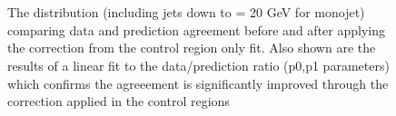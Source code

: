 \begin{figure}[tbhp]
\begin{center}
        \\
         ~~
        \\
        \caption{The \bdphi distribution (including jets down to \pt = 20 GeV for monojet) comparing data and prediction agreement before and after applying the correction from the control region only fit. Also shown are the results of a linear fit to the data/prediction ratio (p0,p1 parameters) which confirms the agreeement is significantly improved through the correction applied in the control regions}
    \end{center}
\end{figure}
